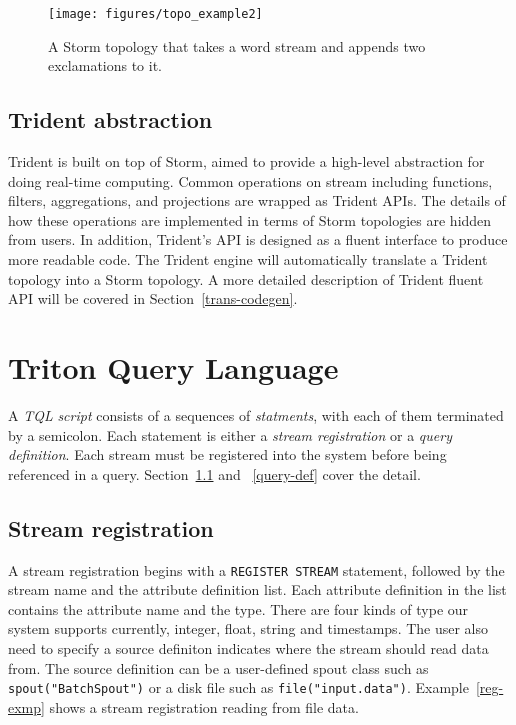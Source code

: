 \documentclass[conference, twocolumn, 11pt]{IEEEtran}
\theoremstyle{definition}
\begin{document}
\begin{figure}[hbt]
\centering
\texttt{[image: figures/topo\_example2]}
\caption{A Storm topology that takes a word stream and appends two exclamations to it.}
\label{topo-crt-exmp}
\end{figure}

\subsection{Trident abstraction}
Trident is built on top of Storm, aimed to provide a high-level abstraction for doing real-time computing. Common operations on stream including functions, filters, aggregations, and projections are wrapped as Trident APIs. The details of how these operations are implemented in terms of Storm topologies are hidden from users. In addition, Trident's API is designed as a fluent interface to produce more readable code. The Trident engine will automatically translate a Trident topology into a Storm topology. A more detailed description of Trident fluent API will be covered in Section~\ref{trans-codegen}.


\section{Triton Query Language}\label{tql}
A \emph{TQL} \emph{script} consists of a sequences of \emph{statments}, with each of them terminated by a semicolon. Each statement is either a \emph{stream registration} or a \emph{query definition}. Each stream must be registered into the system before being referenced in a query. Section~\ref{stream-reg} and ~\ref{query-def} cover the detail.\

\subsection{Stream registration}\label{stream-reg}
A stream registration begins with a \texttt{REGISTER STREAM} statement, followed by the stream name and the attribute definition list. Each attribute definition in the list contains the attribute name and the type. There are four kinds of type our system supports currently, integer, float, string and timestamps. The user also need to specify a source definiton indicates where the stream should read data from. The source definition can be a user-defined spout class such as \texttt{spout("BatchSpout")} or a disk file such as \texttt{file("input.data")}. Example~\ref{reg-exmp} shows a stream registration reading from file data.
\end{document}
